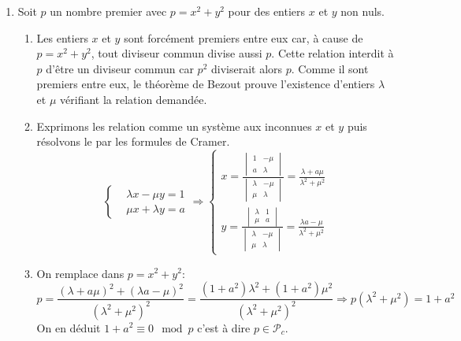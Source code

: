 \begin{enumerate}
\item Soit $p$ un nombre premier avec $p=x^2+y^2$ pour des entiers $x$ et $y$ non nuls.
\begin{enumerate}
  \item Les entiers $x$ et $y$ sont forcément premiers entre eux car, à cause de $p=x^2+y^2$, tout diviseur commun divise aussi $p$. Cette relation interdit à $p$ d'être un diviseur commun car $p^2$ diviserait alors $p$.\newline
  Comme il sont premiers entre eux, le théorème de Bezout prouve l'existence d'entiers $\lambda$ et $\mu$ vérifiant la relation demandée.
  \item Exprimons les relation comme un système aux inconnues $x$ et $y$ puis résolvons le par les formules de Cramer.
\begin{displaymath}
\left\lbrace  
\begin{aligned}
&\lambda x - \mu y = 1 \\ &\mu x + \lambda y = a  
\end{aligned}
\right. 
\Rightarrow
\left\lbrace 
\begin{aligned}
x = \frac
{
\begin{vmatrix}
  1 & - \mu \\ a & \lambda
\end{vmatrix}
}
{
\begin{vmatrix}
  \lambda & -\mu \\ \mu & \lambda
\end{vmatrix}
}  = \frac{\lambda + a\mu}{\lambda^2 + \mu^2}\\
y = \frac
{
\begin{vmatrix}
  \lambda & 1 \\ \mu & a
\end{vmatrix}
}
{
\begin{vmatrix}
  \lambda & -\mu \\ \mu & \lambda
\end{vmatrix}
} = \frac{\lambda a - \mu}{\lambda^2 + \mu^2}
\end{aligned}
\right. 
\end{displaymath}

  \item On remplace dans $p=x^2+y^2$:
\begin{displaymath}
p = \frac{(\lambda + a\mu)^2 + (\lambda a - \mu)^2}{(\lambda^2 + \mu^2)^2}
= \frac{(1+a^2)\lambda^2 + (1+a^2)\mu^2}{(\lambda^2 + \mu^2)^2}
\Rightarrow
p(\lambda^2 + \mu^2) = 1+a^2  
\end{displaymath}
On en déduit $1+a^2 \equiv 0 \mod p$ c'est à dire $p\in \mathcal{P}_c$.
\end{enumerate}


\end{enumerate}
